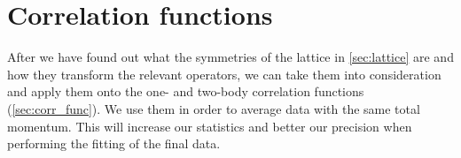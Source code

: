 
  
\section{Correlation functions}
\label{sec:sym-corr}

After we have found out what the symmetries of the lattice in \cref{sec:lattice} are and how they transform the relevant operators, we can take them into consideration and apply them onto the one- and two-body correlation functions (\cref{sec:corr_func}). We use them in order to average data with the same total momentum. This will increase our statistics and better our precision when performing the fitting of the final data.

